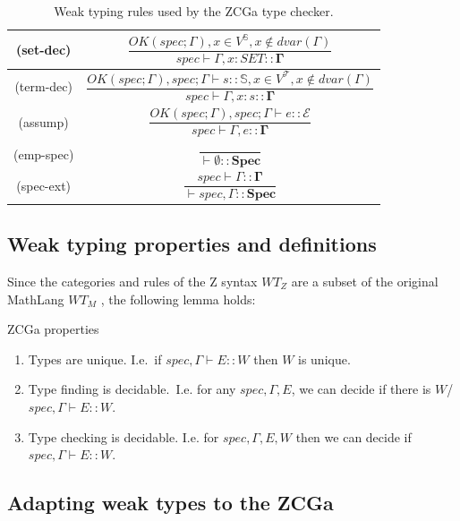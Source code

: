 \begin{table}[H]
\begin{tabular}{| c | c | }
\\[0.25cm] \hline
(set-dec) & $\dfrac{OK(spec;\Gamma), x \in V^{\mathbb{S}}, x \notin dvar(\Gamma)}{spec \vdash \Gamma, x:SET \mathbf{:: \Gamma}}$
\\[0.25cm] \hline
(term-dec) & $\dfrac{OK(spec;\Gamma), spec;\Gamma \vdash s \mathbf{::} \mathbb{S}, x \in V^{\mathcal{T}}, x \notin dvar(\Gamma)}{spec \vdash \Gamma, x:s \mathbf{:: \Gamma}}$ 
\\[0.25cm] \hline
(assump) & $\dfrac{OK(spec;\Gamma), spec;\Gamma \vdash e\mathbf{::}\mathcal{E}}{spec \vdash \Gamma, e \mathbf{:: \Gamma}}$ 
\\[0.25cm] \hline
(emp-spec) & $\dfrac{ }{\vdash \emptyset \mathbf{:: Spec}}$ 
\\[0.25cm] \hline
(spec-ext) & $\dfrac{spec \vdash \Gamma \mathbf{:: \Gamma}}{\vdash spec, \Gamma \mathbf{:: Spec}}$ 
\\[0.25cm] \hline
\end{tabular}
\caption{Weak typing rules used by the ZCGa type checker. \label{tab:wttrules}}
\end{table} 

\subsection{Weak typing properties and definitions}

Since the categories and rules of the Z syntax $WT_{Z}$ are a subset of the original MathLang $WT_{M}$ \cite{wtt}, the following lemma holds:

\begin{lemma}
ZCGa properties \\

\begin{enumerate}
\item Types are unique. I.e.\ if $spec, \Gamma \vdash E \mathbf{::} W$ then $W$ is unique.

\item Type finding is decidable.\ I.e. for any $spec, \Gamma, E$, we can decide if there is $W$/ $spec, \Gamma \vdash E \mathbf{::}W$.

\item Type checking is decidable. I.e. for $spec, \Gamma, E, W$ then we can decide if $spec, \Gamma \vdash E \mathbf{::}W$.
\end{enumerate}
\end{lemma}



\subsection{Adapting weak types to the ZCGa}

